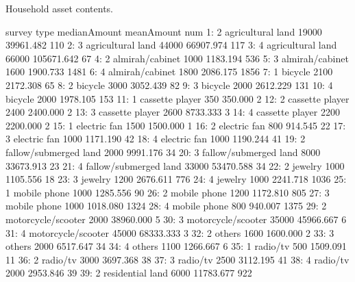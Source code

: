 Household asset contents.
\begin{Schunk}
\begin{Soutput}
    survey                  type medianAmount meanAmount  num
 1:      2     agricultural land        19000  39961.482  110
 2:      3     agricultural land        44000  66907.974  117
 3:      4     agricultural land        66000 105671.642   67
 4:      2       almirah/cabinet         1000   1183.194  536
 5:      3       almirah/cabinet         1600   1900.733 1481
 6:      4       almirah/cabinet         1800   2086.175 1856
 7:      1               bicycle         2100   2172.308   65
 8:      2               bicycle         3000   3052.439   82
 9:      3               bicycle         2000   2612.229  131
10:      4               bicycle         2000   1978.105  153
11:      1       cassette player          350    350.000    2
12:      2       cassette player         2400   2400.000    2
13:      3       cassette player         2600   8733.333    3
14:      4       cassette player         2200   2200.000    2
15:      1          electric fan         1500   1500.000    1
16:      2          electric fan          800    914.545   22
17:      3          electric fan         1000   1171.190   42
18:      4          electric fan         1000   1190.244   41
19:      2 fallow/submerged land         2000   9991.176   34
20:      3 fallow/submerged land         8000  33673.913   23
21:      4 fallow/submerged land        33000  53470.588   34
22:      2               jewelry         1000   1105.556   18
23:      3               jewelry         1200   2676.611  776
24:      4               jewelry         1000   2241.718 1036
25:      1          mobile phone         1000   1285.556   90
26:      2          mobile phone         1200   1172.810  805
27:      3          mobile phone         1000   1018.080 1324
28:      4          mobile phone          800    940.007 1375
29:      2    motorcycle/scooter         2000  38960.000    5
30:      3    motorcycle/scooter        35000  45966.667    6
31:      4    motorcycle/scooter        45000  68333.333    3
32:      2                others         1600   1600.000    2
33:      3                others         2000   6517.647   34
34:      4                others         1100   1266.667    6
35:      1              radio/tv          500   1509.091   11
36:      2              radio/tv         3000   3697.368   38
37:      3              radio/tv         2500   3112.195   41
38:      4              radio/tv         2000   2953.846   39
39:      2      residential land         6000  11783.677  922

\end{Soutput}
\end{Schunk}
